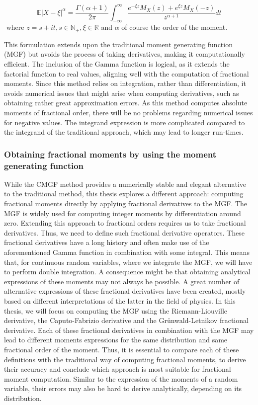 \begin{equation}\label{eq:hansen}
    \mathbb{E}\left| X - \xi \right|^\alpha = \frac{\Gamma(\alpha+1)}{2\pi} \int_{-\infty}^{\infty} \frac{e^{-\xi z} M_X(z) + e^{\xi z} M_X(-z)}{z^{\alpha+1}} dt
\end{equation}
 \(\text{ where } z = s + it, s \in \mathbb{N_+}, \xi \in \mathbb{R} \) and \(\alpha\) of course the order of the moment.

This formulation extends upon the traditional moment generating function (MGF) but avoids the process of taking derivatives, making it computationally efficient. The inclusion of the Gamma function is logical, as it extends the factorial function to real values, aligning well with the computation of fractional moments. Since this method relies on integration, rather than differentiation, it avoids numerical issues that might arise when computing derivatives, such as obtaining rather great approximation errors. As this method computes absolute moments of fractional order, there will be no problems regarding numerical issues for negative values. The integrand expression is more complicated compared to the integrand of the traditional approach, which may lead to longer run-times.

\subsubsection{Obtaining fractional moments by using the moment generating function}
While the CMGF method provides a numerically stable and elegant alternative to the traditional method, this thesis explores a different approach: computing fractional moments directly by applying fractional derivatives to the MGF. The MGF is widely used for computing integer moments by differentiation around zero. Extending this approach to fractional orders requires us to take fractional derivatives. Thus, we need to define such fractional derivative operators. These fractional derivatives have a long history and often make use of the aforementioned Gamma function in combination with some integral. This means that, for continuous random variables, where we integrate the MGF, we will have to perform double integration. A consequence might be that obtaining analytical expressions of these moments may not always be possible. A great number of alternative expressions of these fractional derivatives have been created, mostly based on different interpretations of the latter in the field of physics. In this thesis, we will focus on computing the MGF using the Riemann-Liouville derivative, the Caputo-Fabrizio derivative and the Grünwald-Letnikov fractional derivative. Each of these fractional derivatives in combination with the MGF may lead to different moments expressions for the same distribution and same fractional order of the moment. Thus, it is essential to compare each of these definitions with the traditional way of computing fractional moments, to derive their accuracy and conclude which approach is most suitable for fractional moment computation. Similar to the expression of the moments of a random variable, their errors may also be hard to derive analytically, depending on its distribution.

